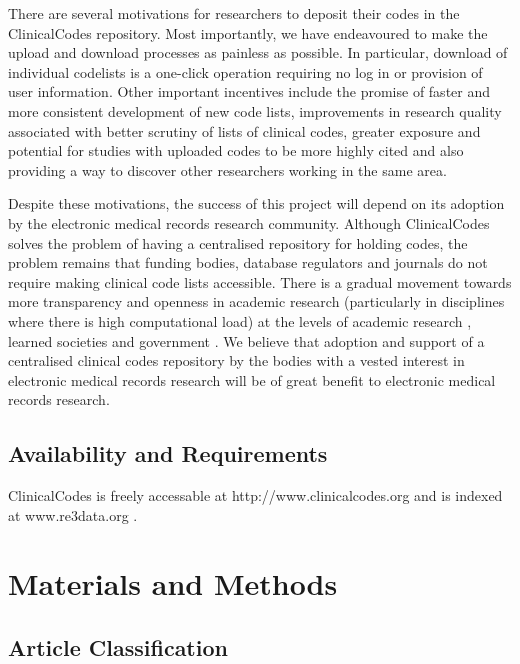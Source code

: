 \documentclass[10pt]{article}
\begin{document}
There are several motivations for researchers to deposit their codes in the ClinicalCodes repository.  Most importantly, we have endeavoured to make the upload and download processes as painless as possible.  In particular, download of individual codelists is a one-click operation requiring no log in or provision of user information.  Other important incentives include the promise of faster and more consistent development of new code lists, improvements in research quality associated with better scrutiny of lists of clinical codes, greater exposure and potential for studies with uploaded codes to be more highly cited and also providing a way to discover other researchers working in the same area.

Despite these motivations, the success of this project will depend on its adoption by the electronic medical records research community. Although ClinicalCodes solves the problem of having a centralised repository for holding codes, the problem remains that funding bodies, database regulators and journals do not require making clinical code lists accessible. There is a gradual movement towards more transparency and openness in academic research (particularly in disciplines where there is high computational load) at the levels of academic research \cite{Bechhofer2013, Stodden2013, Pampel2013}, learned societies \cite{RoyalSoc2012} and government \cite{EuropeanCommission2012, OfficeSciTech2013}. We believe that adoption and support of a centralised clinical codes repository by the bodies with a vested interest in electronic medical records research will be of great benefit to electronic medical records research.


\subsection*{Availability and Requirements}


ClinicalCodes is freely accessable at http://www.clinicalcodes.org and is indexed at www.re3data.org \cite{Pampel2013}.

\section*{Materials and Methods}

\subsection*{Article Classification}
\end{document}
